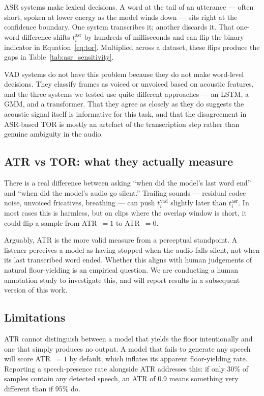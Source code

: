 \documentclass[a4paper]{article}
\begin{document}
ASR systems make lexical decisions. A word at the tail of an utterance --- often
short, spoken at lower energy as the model winds down --- sits right at the
confidence boundary. One system transcribes it; another discards it. That
one-word difference shifts $t^{\text{asr}}_i$ by hundreds of milliseconds and
can flip the binary indicator in Equation~\ref{eq:tor}. Multiplied across a
dataset, these flips produce the gaps in Table~\ref{tab:asr_sensitivity}.

VAD systems do not have this problem because they do not make word-level
decisions. They classify frames as voiced or unvoiced based on acoustic
features, and the three systems we tested use quite different approaches ---
an LSTM, a GMM, and a transformer. That they agree as closely as they do
suggests the acoustic signal itself is informative for this task, and that
the disagreement in ASR-based TOR is mostly an artefact of the transcription
step rather than genuine ambiguity in the audio.

\subsection{ATR vs TOR: what they actually measure}

There is a real difference between asking ``when did the model's last word
end'' and ``when did the model's audio go silent.'' Trailing sounds ---
residual codec noise, unvoiced fricatives, breathing --- can push
$t^{\text{vad}}_i$ slightly later than $t^{\text{asr}}_i$. In most cases
this is harmless, but on clips where the overlap window is short, it could
flip a sample from ATR~$= 1$ to ATR~$= 0$.

Arguably, ATR is the more valid measure from a perceptual standpoint. A listener
perceives a model as having stopped when the audio falls silent, not when its
last transcribed word ended. Whether this aligns with human judgements of
natural floor-yielding is an empirical question. We are conducting a human
annotation study to investigate this, and will report results in a subsequent
version of this work.

\subsection{Limitations}

ATR cannot distinguish between a model that yields the floor intentionally
and one that simply produces no output. A model that fails to generate any
speech will score ATR~$= 1$ by default, which inflates its apparent
floor-yielding rate. Reporting a speech-presence rate alongside ATR addresses
this: if only 30\% of samples contain any detected speech, an ATR of 0.9 means
something very different than if 95\% do.
\end{document}
